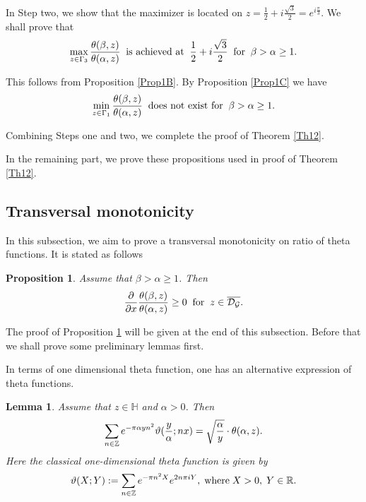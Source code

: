 \documentclass[reqno,english]{amsart}
\newtheorem{lemma}{Lemma}[section]
\newtheorem{proposition}{Proposition}[section]
\newtheorem{open problem}{Open Problem}[section]
\newtheorem{open question}{Open Question}[section]
\newtheorem{open questions on hexagonal lattice}{Open Questions on hexagonal lattice}[section]
\newcommand{\R}{{\mathbb R}}
\begin{document}
In Step two, we show that the maximizer is located on $z=\frac{1}{2}+i\frac{\sqrt3}{2}=e^{i\frac{\pi}{3}}$.
We shall prove that
 \begin{equation}\aligned
\max_{z\in\Gamma_3}\frac{\theta(\beta,z)}{\theta(\alpha,z)}\;\;\hbox{is achieved at}\;\;\frac{1}{2}+i\frac{\sqrt3}{2}\;\;\hbox{for}\;\;\beta>\alpha\geq1.
\endaligned\end{equation}

This follows from Proposition \ref{Prop1B}. By Proposition \ref{Prop1C} we have
\begin{equation}\aligned
\min_{z\in\Gamma_1}\frac{\theta(\beta,z)}{\theta(\alpha,z)}\;\;\hbox{does not exist for}\;\;\beta>\alpha\geq1.
\endaligned\end{equation}

Combining Steps one and two, we complete the proof of Theorem \ref{Th12}.

In the remaining part, we prove these propositions  used in proof of Theorem \ref{Th12}.

\subsection{Transversal monotonicity}


In this subsection, we aim to prove a transversal monotonicity on ratio of theta functions.
It is stated as follows
\begin{proposition}\label{Prop1A} Assume that $\beta>\alpha\geq1$. Then
\begin{equation}\aligned\nonumber
\frac{\partial}{\partial x}\frac{\theta(\beta,z)}{\theta(\alpha,z)}\geq0\;\;\hbox{for}\;\;z\in\overline{\mathcal{D}_{\mathcal{G}}}.
\endaligned\end{equation}

\end{proposition}

The proof of Proposition \ref{Prop1A} will be given at the end of this subsection. Before that we shall prove some preliminary lemmas first.

In terms of one dimensional theta function, one has an alternative expression of theta functions.
\begin{lemma}\label{Lemma21} Assume that $z\in \mathbb{H}$ and $\alpha>0$. Then
\begin{equation}\aligned\label{CM3}
\sum_{n\in\mathbb{Z}} e^{-\pi\alpha yn^2}\vartheta(\frac{y}{\alpha};nx)=
\sqrt{\frac{\alpha}{y}}\cdot\theta(\alpha,z).
\endaligned\end{equation}
Here the classical one-dimensional theta function  is given by
\begin{equation}\aligned\label{TXY}
\vartheta(X;Y):=\sum_{n\in\mathbb{Z}} e^{-\pi n^2 X} e^{2n\pi i Y},\;\hbox{where}\; X>0,\; Y\in\R.
 \endaligned\end{equation}
\end{lemma}
\end{document}
